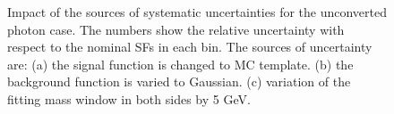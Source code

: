 \begin{figure}[!htbp]
\centering
{}
\quad
{}

\caption[] {Impact of the sources of systematic uncertainties for the unconverted photon case. The numbers show the relative uncertainty with respect to the nominal SFs in each bin. The sources of uncertainty are: (a) the signal function is changed to MC template. (b) the background function is varied to Gaussian. (c) variation of the fitting mass window in both sides by 5 GeV.}
\label{fig:impact_of_uncertainty_unconverted}
\end{figure}

\FloatBarrier
